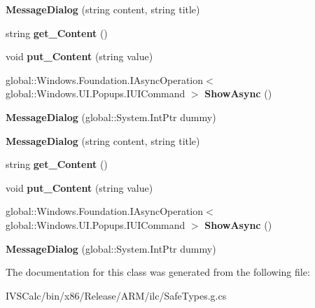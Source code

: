 \begin{DoxyCompactItemize}
{\bfseries Message\+Dialog} (string content, string title)
\item 
\mbox{\label{class_windows_1_1_u_i_1_1_popups_1_1_message_dialog_a5dfca1b3a2d32d5796ee862e6ce6d463}} 
string {\bfseries get\+\_\+\+Content} ()
\item 
\mbox{\label{class_windows_1_1_u_i_1_1_popups_1_1_message_dialog_acbe1e51198d51c884324ef14c8eb18fd}} 
void {\bfseries put\+\_\+\+Content} (string value)
\item 
\mbox{\label{class_windows_1_1_u_i_1_1_popups_1_1_message_dialog_a8e63c5ddb4030ceeb6e297828c9c9e8b}} 
global\+::\+Windows.\+Foundation.\+I\+Async\+Operation$<$ global\+::\+Windows.\+U\+I.\+Popups.\+I\+U\+I\+Command $>$ {\bfseries Show\+Async} ()
\item 
\mbox{\label{class_windows_1_1_u_i_1_1_popups_1_1_message_dialog_a3f82d7d935a9d6b254124727d7e3c793}} 
{\bfseries Message\+Dialog} (global\+::\+System.\+Int\+Ptr dummy)
\item 
\mbox{\label{class_windows_1_1_u_i_1_1_popups_1_1_message_dialog_a6e6261d06149819ffae64bd6cf844452}} 
{\bfseries Message\+Dialog} (string content, string title)
\item 
\mbox{\label{class_windows_1_1_u_i_1_1_popups_1_1_message_dialog_a5dfca1b3a2d32d5796ee862e6ce6d463}} 
string {\bfseries get\+\_\+\+Content} ()
\item 
\mbox{\label{class_windows_1_1_u_i_1_1_popups_1_1_message_dialog_acbe1e51198d51c884324ef14c8eb18fd}} 
void {\bfseries put\+\_\+\+Content} (string value)
\item 
\mbox{\label{class_windows_1_1_u_i_1_1_popups_1_1_message_dialog_a8e63c5ddb4030ceeb6e297828c9c9e8b}} 
global\+::\+Windows.\+Foundation.\+I\+Async\+Operation$<$ global\+::\+Windows.\+U\+I.\+Popups.\+I\+U\+I\+Command $>$ {\bfseries Show\+Async} ()
\item 
\mbox{\label{class_windows_1_1_u_i_1_1_popups_1_1_message_dialog_a3f82d7d935a9d6b254124727d7e3c793}} 
{\bfseries Message\+Dialog} (global\+::\+System.\+Int\+Ptr dummy)
\end{DoxyCompactItemize}


The documentation for this class was generated from the following file\+:\begin{DoxyCompactItemize}
\item 
I\+V\+S\+Calc/bin/x86/\+Release/\+A\+R\+M/ilc/Safe\+Types.\+g.\+cs\end{DoxyCompactItemize}
